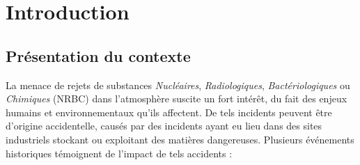 \chapter{Introduction}

\section{Présentation du contexte}
	La menace de rejets de substances \textit{Nucléaires}, \textit{Radiologiques}, \textit{Bactériologiques} ou \textit{Chimiques} (NRBC) dans l'atmosphère suscite un fort intérêt, du fait des enjeux humains et environnementaux qu'ils affectent. De tels incidents peuvent être d'origine accidentelle, causés par des incidents ayant eu lieu dans des sites industriels stockant ou exploitant des matières dangereuses. Plusieurs événements historiques témoignent de l'impact de tels accidents :\\
